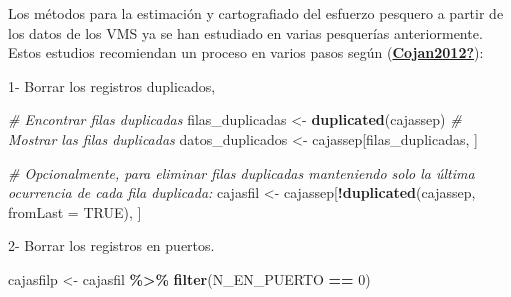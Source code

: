 \documentclass[
]{article}
\newenvironment{Shaded}{\begin{snugshade}}{\end{snugshade}}
\newcommand{\AttributeTok}[1]{\textcolor[rgb]{0.13,0.29,0.53}{#1}}
\newcommand{\CommentTok}[1]{\textcolor[rgb]{0.56,0.35,0.01}{\textit{#1}}}
\newcommand{\ConstantTok}[1]{\textcolor[rgb]{0.56,0.35,0.01}{#1}}
\newcommand{\DecValTok}[1]{\textcolor[rgb]{0.00,0.00,0.81}{#1}}
\newcommand{\FloatTok}[1]{\textcolor[rgb]{0.00,0.00,0.81}{#1}}
\newcommand{\FunctionTok}[1]{\textcolor[rgb]{0.13,0.29,0.53}{\textbf{#1}}}
\newcommand{\NormalTok}[1]{#1}
\newcommand{\OtherTok}[1]{\textcolor[rgb]{0.56,0.35,0.01}{#1}}
\newcommand{\SpecialCharTok}[1]{\textcolor[rgb]{0.81,0.36,0.00}{\textbf{#1}}}
\newcommand{\StringTok}[1]{\textcolor[rgb]{0.31,0.60,0.02}{#1}}
\begin{document}
Los métodos para la estimación y cartografiado del esfuerzo pesquero a partir de los datos de los VMS ya se han estudiado en varias pesquerías anteriormente. Estos estudios recomiendan un proceso en varios pasos según (\protect\hyperlink{ref-Cojan2012}{\textbf{Cojan2012?}}):

1- Borrar los registros duplicados,

\begin{Shaded}
\begin{Highlighting}[]
\CommentTok{\# Encontrar filas duplicadas}
\NormalTok{filas\_duplicadas }\OtherTok{\textless{}{-}} \FunctionTok{duplicated}\NormalTok{(cajassep)}
\CommentTok{\# Mostrar las filas duplicadas}
\NormalTok{datos\_duplicados }\OtherTok{\textless{}{-}}\NormalTok{ cajassep[filas\_duplicadas, ]}

\CommentTok{\# Opcionalmente, para eliminar filas duplicadas manteniendo solo la última ocurrencia de cada fila duplicada:}
\NormalTok{cajasfil }\OtherTok{\textless{}{-}}\NormalTok{ cajassep[}\SpecialCharTok{!}\FunctionTok{duplicated}\NormalTok{(cajassep, }
                                 \AttributeTok{fromLast =} \ConstantTok{TRUE}\NormalTok{), ]}
\end{Highlighting}
\end{Shaded}

2- Borrar los registros en puertos.

\begin{Shaded}
\begin{Highlighting}[]
\NormalTok{cajasfilp }\OtherTok{\textless{}{-}}\NormalTok{ cajasfil }\SpecialCharTok{\%\textgreater{}\%} 
  \FunctionTok{filter}\NormalTok{(N\_EN\_PUERTO }\SpecialCharTok{==} \DecValTok{0}\NormalTok{)}
\end{Highlighting}
\end{Shaded}

\begin{Shaded}
\end{Shaded}
\end{document}
